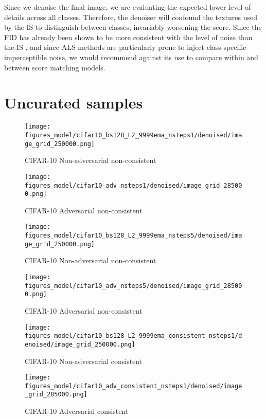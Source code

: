 \documentclass{article} \usepackage{iclr2021_conference_notitle,times}
\theoremstyle{definition}
\theoremstyle{definition}
\begin{document}
Since we denoise the final image, we are evaluating the expected lower level of details across all classes. Therefore, the denoiser will confound the textures used by the IS to distinguish between classes, invariably worsening the score. Since the FID has already been shown to be more consistent with the level of noise than the IS \citep{heusel2017gans}, and since ALS methods are particularly prone to inject class-specific imperceptible noise, we would recommend against its use to compare within and between score matching models.










\newpage
\section{Uncurated samples}

\begin{figure}[ht] 
    \centering
    \texttt{[image: figures\_model/cifar10\_bs128\_L2\_9999ema\_nsteps1/denoised/image\_grid\_250000.png]}
    \caption{CIFAR-10 Non-adversarial non-consistent } 
\end{figure}
\begin{figure}[ht] 
    \centering
    \texttt{[image: figures\_model/cifar10\_adv\_nsteps1/denoised/image\_grid\_285000.png]}
    \caption{CIFAR-10 Adversarial non-consistent } 
\end{figure}

\begin{figure}[ht] 
    \centering
    \texttt{[image: figures\_model/cifar10\_bs128\_L2\_9999ema\_nsteps5/denoised/image\_grid\_250000.png]}
    \caption{CIFAR-10 Non-adversarial non-consistent } 
\end{figure}
\begin{figure}[ht] 
    \centering
    \texttt{[image: figures\_model/cifar10\_adv\_nsteps5/denoised/image\_grid\_285000.png]}
    \caption{CIFAR-10 Adversarial non-consistent } 
\end{figure}

\begin{figure}[ht] 
    \centering
    \texttt{[image: figures\_model/cifar10\_bs128\_L2\_9999ema\_consistent\_nsteps1/denoised/image\_grid\_250000.png]}
    \caption{CIFAR-10 Non-adversarial consistent } 
\end{figure}
\begin{figure}[ht] 
    \centering
    \texttt{[image: figures\_model/cifar10\_adv\_consistent\_nsteps1/denoised/image\_grid\_285000.png]}
    \caption{CIFAR-10 Adversarial consistent } 
\end{figure}
\end{document}
